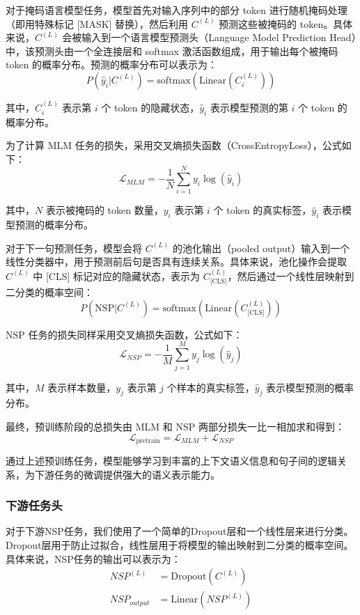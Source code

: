 \documentclass[12pt, a4paper]{ctexart}
\begin{document}
对于掩码语言模型任务，模型首先对输入序列中的部分 token 进行随机掩码处理（即用特殊标记 [MASK] 替换），然后利用 $C^{(L)}$ 预测这些被掩码的 token。具体来说，$C^{(L)}$ 会被输入到一个语言模型预测头（Language Model Prediction Head）中，该预测头由一个全连接层和 softmax 激活函数组成，用于输出每个被掩码 token 的概率分布。预测的概率分布可以表示为：
\begin{equation}
    P(\hat{y}_i | C^{(L)}) = \text{softmax}(\text{Linear}(C^{(L)}_i))
\end{equation}

其中，$C^{(L)}_i$ 表示第 $i$ 个 token 的隐藏状态，$\hat{y}_i$ 表示模型预测的第 $i$ 个 token 的概率分布。

为了计算 MLM 任务的损失，采用交叉熵损失函数（CrossEntropyLoss），公式如下：
\begin{equation}
    \mathcal{L}_{MLM} = -\frac{1}{N} \sum_{i=1}^{N} y_i \log(\hat{y}_i)
\end{equation}

其中，$N$ 表示被掩码的 token 数量，$y_i$ 表示第 $i$ 个 token 的真实标签，$\hat{y}_i$ 表示模型预测的概率分布。


对于下一句预测任务，模型会将 $C^{(L)}$ 的池化输出（pooled output）输入到一个线性分类器中，用于预测前后句是否具有连续关系。具体来说，池化操作会提取 $C^{(L)}$ 中 [CLS] 标记对应的隐藏状态，表示为 $C^{(L)}_{\text{[CLS]}}$，然后通过一个线性层映射到二分类的概率空间：
\begin{equation}
    P(\text{NSP} | C^{(L)}) = \text{softmax}(\text{Linear}(C^{(L)}_{\text{[CLS]}}))
\end{equation}

NSP 任务的损失同样采用交叉熵损失函数，公式如下：
\begin{equation}
    \mathcal{L}_{NSP} = -\frac{1}{M} \sum_{j=1}^{M} y_j \log(\hat{y}_j)
\end{equation}

其中，$M$ 表示样本数量，$y_j$ 表示第 $j$ 个样本的真实标签，$\hat{y}_j$ 表示模型预测的概率分布。

最终，预训练阶段的总损失由 MLM 和 NSP 两部分损失一比一相加求和得到：
\begin{equation}
    \mathcal{L}_{\text{pretrain}} = \mathcal{L}_{MLM} + \mathcal{L}_{NSP}
\end{equation}

通过上述预训练任务，模型能够学习到丰富的上下文语义信息和句子间的逻辑关系，为下游任务的微调提供强大的语义表示能力。

\subsubsection{下游任务头}
对于下游NSP任务，我们使用了一个简单的Dropout层和一个线性层来进行分类。Dropout层用于防止过拟合，线性层用于将模型的输出映射到二分类的概率空间。具体来说，NSP任务的输出可以表示为：
\begin{equation}
    \begin{split}
        NSP^{(L)} &= \text{Dropout}(C^{(L)}) \\
        NSP_{output} &= \text{Linear}(NSP^{(L)}) \\
    \end{split}
\end{equation}
\end{document}
